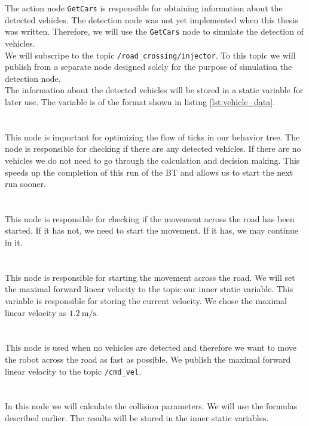         The action node \texttt{GetCars} is responsible for obtaining information about the detected vehicles. The detection node was not yet implemented when this thesis was written. Therefore, we will use the \texttt{GetCars} node to simulate the detection of vehicles.\\
        We will subscripe to the topic \texttt{/road\_crossing/injector}. To this topic we will publish from a separate node designed solely for the purpose of simulation the detection node.\\
        The information about the detected vehicles will be stored in a static variable for later use. The variable is of the format shown in listing \ref{lst:vehicle_data}.\\\\
    \\
        This node is important for optimizing the flow of ticks in our behavior tree. The node is responsible for checking if there are any detected vehicles. If there are no vehicles we do not need to go through the calculation and decision making. This speeds up the completion of this run of the BT and allows us to start the next run sooner.\\\\
    \\
        This node is responsible for checking if the movement across the road has been started. If it has not, we need to start the movement. If it has, we may continue in it.\\\\
    \\
        This node is responsible for starting the movement across the road. We will set the maximal forward linear velocity to the topic our inner static variable. This variable is responsible for storing the current velocity. We chose the maximal linear velocity as $1.2\:\si{\m\per\s}$.\\\\
    \\
        This node is used when no vehicles are detected and therefore we want to move the robot across the road as fast as possible. We publish the maximal forward linear velocity to the topic \texttt{/cmd\_vel}.\\\\
    \\
        In this node we will calculate the collision parameters. We will use the formulas described earlier. The results will be stored in the inner static variables.\\
